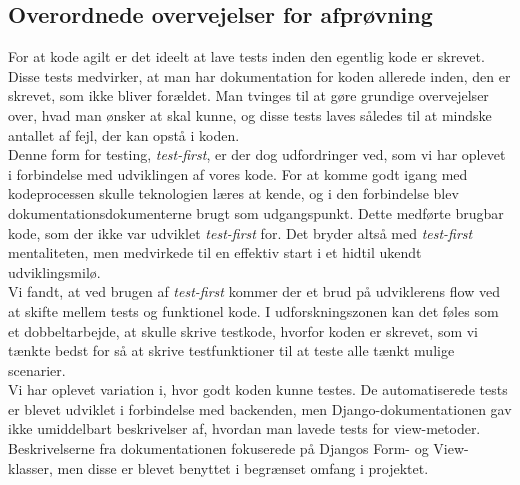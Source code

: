 \documentclass[]{article}
\begin{document}
\subsection{Overordnede overvejelser for afprøvning}
For at kode agilt er det ideelt at lave tests inden den egentlig kode er skrevet. Disse tests medvirker, at man har dokumentation for koden allerede inden, den er skrevet, som ikke bliver forældet. Man tvinges til at gøre grundige overvejelser over, hvad man ønsker at skal kunne, og disse tests laves således til at mindske antallet af fejl, der kan opstå i koden. \\
Denne form for testing, \textit{test-first}, er der dog udfordringer ved, som vi har oplevet i forbindelse med udviklingen af vores kode. For at komme godt igang med kodeprocessen skulle teknologien læres at kende, og i den forbindelse blev dokumentationsdokumenterne brugt som udgangspunkt. Dette medførte brugbar kode, som der ikke var udviklet \textit{test-first} for. Det bryder altså med \textit{test-first} mentaliteten, men medvirkede til en effektiv start i et hidtil ukendt udviklingsmilø. \\
\indent Vi fandt, at ved brugen af \textit{test-first} kommer der et brud på udviklerens flow ved at skifte mellem tests og funktionel kode. I udforskningszonen kan det føles som et dobbeltarbejde, at skulle skrive testkode, hvorfor koden er skrevet, som vi tænkte bedst for så at skrive testfunktioner til at teste alle tænkt mulige scenarier. \\
\indent Vi har oplevet variation i, hvor godt koden kunne testes. De automatiserede tests er blevet udviklet i forbindelse med backenden, men Django-dokumentationen \cite{DjangoDoc} gav ikke umiddelbart beskrivelser af, hvordan man lavede tests for view-metoder. Beskrivelserne fra dokumentationen fokuserede på Djangos Form- og View-klasser, men disse er blevet benyttet i begrænset omfang i projektet.
\end{document}
